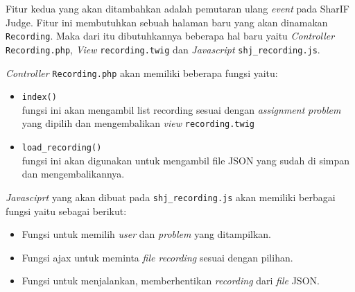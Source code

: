 Fitur kedua yang akan ditambahkan adalah pemutaran ulang \textit{event} pada SharIF Judge. Fitur ini membutuhkan sebuah halaman baru yang akan dinamakan \verb|Recording|. Maka dari itu dibutuhkannya beberapa hal baru yaitu \textit{Controller} \verb|Recording.php|, \textit{View} \verb|recording.twig| dan \textit{Javascript} \verb|shj_recording.js|.

\textit{Controller} \verb|Recording.php| akan memiliki beberapa fungsi yaitu:
\begin{itemize}
	\item \verb|index()| \\
	      fungsi ini akan mengambil list recording sesuai dengan \textit{assignment} \textit{problem} yang dipilih dan mengembalikan \textit{view} \verb|recording.twig|
	\item \verb|load_recording()| \\
	      fungsi ini akan digunakan untuk mengambil file JSON yang sudah di simpan dan mengembalikannya.
\end{itemize}

\textit{Javasciprt} yang akan dibuat pada \verb|shj_recording.js| akan memiliki berbagai fungsi yaitu sebagai berikut:

\begin{itemize}
	\item Fungsi untuk memilih \textit{user} dan \textit{problem} yang ditampilkan.
	\item Fungsi ajax untuk meminta \textit{file recording} sesuai dengan pilihan.
	\item Fungsi untuk menjalankan, memberhentikan \textit{recording} dari \textit{file} JSON.
\end{itemize}

\begin{comment}
Pemuratar ulang, bikin halaman baru. ada list user-nya, problemnya, di click baru kaya ngeload gt dari folder assignment.
\end{comment}